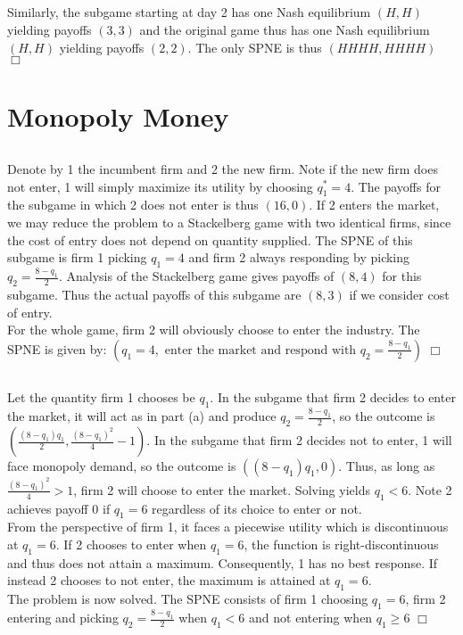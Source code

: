 \documentclass{article}
\begin{document}
\subsection{}
Similarly, the subgame starting at day 2 has one Nash equilibrium $(H,H)$ yielding payoffs $(3,3)$ and the original game thus has one Nash equilibrium $(H,H)$ yielding payoffs $(2,2)$. The only SPNE is thus $(HHHH,HHHH)$ $\Box$

\section{Monopoly Money}
\subsection{}
Denote by 1 the incumbent firm and 2 the new firm. Note if the new firm does not enter, 1 will simply maximize its utility by choosing $q_1^* = 4$. The payoffs for the subgame in which 2 does not enter is thus $(16,0)$. If 2 enters the market, we may reduce the problem to a Stackelberg game with two identical firms, since the cost of entry does not depend on quantity supplied. The SPNE of this subgame is firm 1 picking $q_1 = 4$ and firm 2 always responding by picking $q_2 = \frac{8-q_1}{2}$. Analysis of the Stackelberg game gives payoffs of $(8,4)$ for this subgame. Thus the actual payoffs of this subgame are $(8,3)$ if we consider cost of entry.\\
For the whole game, firm 2 will obviously choose to enter the industry. The SPNE is given by: $(q_1 = 4, \text{ enter the market and respond with } q_2 = \frac{8-q_1}{2})$ $\Box$

\subsection{}
Let the quantity firm 1 chooses be $q_1$. In the subgame that firm 2 decides to enter the market, it will act as in part (a) and produce $q_2 = \frac{8 - q_1}{2}$, so the outcome is $(\frac{(8-q_1)q_1}{2}, \frac{\left(8-q_1\right)^2}{4} - 1)$. In the subgame that firm 2 decides not to enter, 1 will face monopoly demand, so the outcome is $((8-q_1)q_1,0)$. Thus, as long as $\frac{\left(8-q_1\right)^2}{4} > 1$, firm 2 will choose to enter the market. Solving yields $q_1 < 6$. Note 2 achieves payoff 0 if $q_1 = 6$ regardless of its choice to enter or not.\\
From the perspective of firm 1, it faces a piecewise utility which is discontinuous at $q_1 = 6$. If 2 chooses to enter when $q_1 = 6$, the function is right-discontinuous and thus does not attain a maximum. Consequently, 1 has no best response. If instead 2 chooses to not enter, the maximum is attained at $q_1 = 6$.\\
The problem is now solved. The SPNE consists of firm 1 choosing $q_1 = 6$, firm 2 entering and picking $q_2 = \frac{8-q_1}{2}$ when $q_1 < 6$ and not entering when $q_1 \geq 6$ $\Box$
\end{document}
